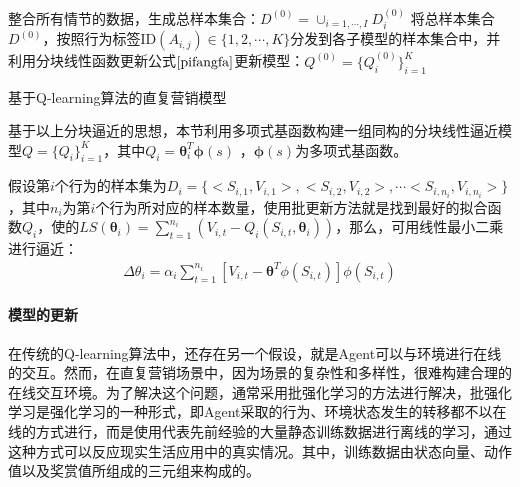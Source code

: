 \begin{algorithm}[htbp]
\small
\SetAlgoLined
{} 

整合所有情节的数据，生成总样本集合：$D^{(0)}=\cup_{i=1,\cdots,I} D_{i}^{(0)}$\;
将总样本集合$D^{(0)}$，按照行为标签ID$(A_{i,j}) \in \{1,2,\cdots, K \}$分发到各子模型的样本集合中，并利用分块线性函数更新公式$\eqref{pifangfa}$更新模型：$Q^{(0)}=\{Q_{i}^{(0)}\}_{i=1}^{K}$\;
\caption{基于Q-learning算法的直复营销模型}
\label{algo:SVR+Q}
\end{algorithm}

基于以上分块逼近的思想，本节利用多项式基函数构建一组同构的分块线性逼近模型$Q=\{Q_{i}\}_{i=1}^{K}$，其中$Q_{i}=\bm{\theta}_{i}^{T} \bm{\phi}(s)$ ，$\bm{\phi}(s)$为多项式基函数。

假设第$i$个行为的样本集为$D_{i}=\{<S_{i,1},V_{i,1}>, <S_{i,2}, V_{i,2}>, \cdots <S_{i,n_{i}},V_{i,n_{i}}>\}$，其中$n_{i}$为第$i$个行为所对应的样本数量，使用批更新方法就是找到最好的拟合函数$Q_{i}$，使的$LS(\bm{\theta}_{i})=\sum_{t=1}^{n_{i}}(V_{i,t}-Q_{i}(S_{i,t},\bm{\theta}_{i}))$，那么，可用线性最小二乘进行逼近：
\begin{equation}\label{pifangfa}
\begin{aligned}
\Delta \theta_{i} = \alpha_{i} \sum_{t=1}^{n_{i}}[V_{i,t}-\bm{\theta}^{T} \phi(S_{i,t})] \phi(S_{i,t})
\end{aligned}
\end{equation}

\paragraph{模型的更新}
在传统的Q-learning算法中，还存在另一个假设，就是Agent可以与环境进行在线的交互。然而，在直复营销场景中，因为场景的复杂性和多样性，很难构建合理的在线交互环境。为了解决这个问题，通常采用批强化学习\citep{lange2012batch}的方法进行解决，批强化学习是强化学习的一种形式，即Agent采取的行为、环境状态发生的转移都不以在线的方式进行，而是使用代表先前经验的大量静态训练数据进行离线的学习，通过这种方式可以反应现实生活应用中的真实情况。其中，训练数据由状态向量、动作值以及奖赏值所组成的三元组来构成的。

